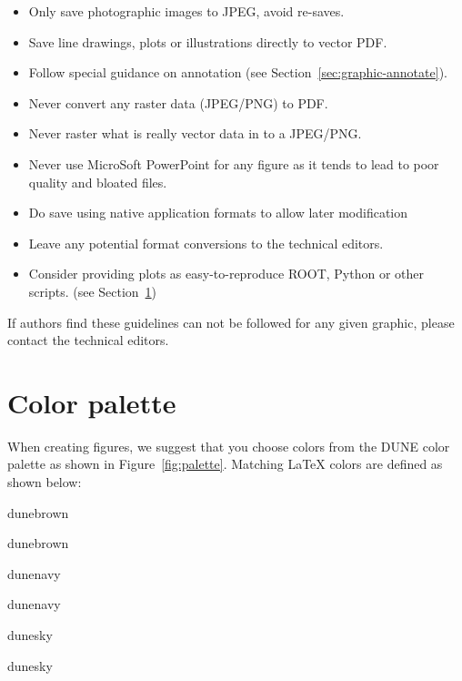 \begin{itemize}
\item Only save photographic images to JPEG, avoid re-saves.
\item Save line drawings, plots or illustrations directly to vector PDF.
\item Follow special guidance on annotation (see Section~\ref{sec:graphic-annotate}).
\item Never convert any raster data (JPEG/PNG) to PDF.
\item Never raster what is really vector data in to a JPEG/PNG.
\item Never use MicroSoft PowerPoint for any figure as it tends to lead to poor quality and bloated files.
\item Do save using native application formats to allow later
  modification
\item Leave any potential format conversions to the technical editors.
\item Consider providing plots as easy-to-reproduce ROOT, Python or
  other scripts.
  (see Section~\ref{sec:graphic-plots})
\end{itemize}

\noindent If authors find these guidelines can not be followed for any
given graphic, please contact the technical editors.   

\section{Color palette}
\label{sec:graphic-plots}

When creating figures, we suggest that you choose colors from the DUNE color palette as shown in Figure~\ref{fig:palette}. 
Matching \LaTeX{} colors are defined as shown below:

\noindent
\begin{minipage}[t]{0.3\linewidth}
  \begin{tcolorbox}[colback=dunebrown]
    dunebrown    
  \end{tcolorbox}
  \begin{tcolorbox}[colback=white,colframe=dunebrown]
    dunebrown    
  \end{tcolorbox}
\end{minipage}
\begin{minipage}[t]{0.3\linewidth}
  \begin{tcolorbox}[colback=dunenavy]
    dunenavy    
  \end{tcolorbox}
  \begin{tcolorbox}[colback=white,colframe=dunenavy]
    dunenavy    
  \end{tcolorbox}
\end{minipage}
\begin{minipage}[t]{0.3\linewidth}
  \begin{tcolorbox}[colback=dunesky]
    dunesky    
  \end{tcolorbox}
  \begin{tcolorbox}[colback=white,colframe=dunesky]
    dunesky    
  \end{tcolorbox}
\end{minipage}

